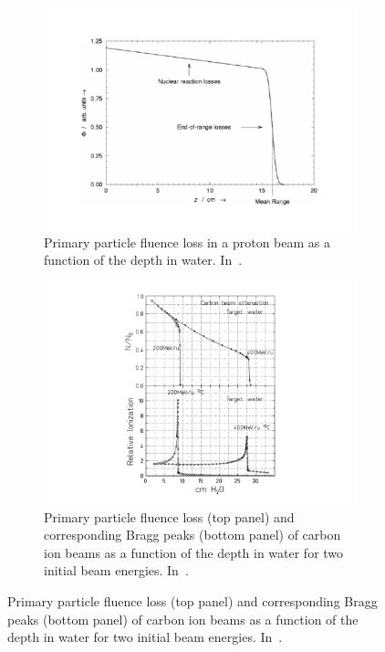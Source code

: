 \begin{figure}
\begin{subfigure}[t]{.49\textwidth}
\hspace{-1cm} \includegraphics[width=1.2\linewidth]{03_GraphicFiles/chapter1_Introduction/primaryLoss.pdf}
\caption{Primary particle fluence loss in a pro\-ton beam as a function of the depth in water. In~\cite{Newhauser2015}.}
\label{chap1::fig::nuclearReacLoss}
\end{subfigure}
\begin{subfigure}[t]{.49\textwidth}
\hspace{-1cm} \includegraphics[width=1.2\linewidth, trim={1.5cm 0 1.5cm 0}, clip = true]{03_GraphicFiles/chapter1_Introduction/primaryLoss_Cion.pdf}
\caption{Primary particle fluence loss (top panel) and corresponding Bragg peaks (bottom panel) of carbon ion beams as a function of the depth in water for two initial beam energies. In~\cite{Haettner2006}.}

\end{subfigure}
\end{figure}
